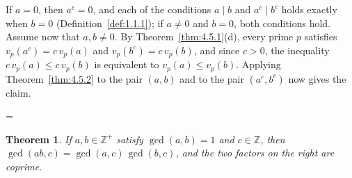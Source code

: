 \documentclass[11pt]{article}
\makeatletter
\theoremstyle{ntstyle}
\newtheorem{theorem}{Theorem}[subsection]
\let\nt@closedisplay\]
\def\nt@guardedclose{\@ifnextchar\par{\nt@closeafterpar}{\@ifnextchar\end{\postdisplaypenalty\@M\nt@closedisplay}{\nt@closedisplay}}}
\def\nt@closeafterpar\par{\@ifnextchar\par{\nt@closeafterpar}{\@ifnextchar\end{\postdisplaypenalty\@M\nt@closedisplay\par}{\nt@closedisplay\par}}}
\renewenvironment{proof}[1][\proofname]{\par
  \pushQED{\qed}\normalfont\topsep\medskipamount\edef\nt@afterproof{\@endparpenalty=\the\@endparpenalty\relax}\@beginparpenalty\@M\@endparpenalty\@M\let\]\nt@guardedclose\trivlist\item[]\textit{#1\@addpunct{.}} \ignorespaces}{\ifvmode\addpenalty\@M\fi\popQED\nt@afterproof\endtrivlist\@endpefalse}
\makeatother
\begin{document}
\begin{proof} If $a=0$, then $a^{c}=0$, and each of the conditions $a\mid b$
	and $a^{c}\mid b^{c}$ holds exactly when $b=0$
	(Definition~\ref{def:1.1.1}); if $a\neq0$ and $b=0$, both conditions hold.
	Assume now that $a,b\neq0$. By Theorem~\ref{thm:4.5.1}(d), every prime $p$
	satisfies $v_p(a^{c})=c\,v_p(a)$ and $v_p(b^{c})=c\,v_p(b)$, and since
	$c>0$, the inequality $c\,v_p(a)\le c\,v_p(b)$ is equivalent to
	$v_p(a)\le v_p(b)$. Applying Theorem~\ref{thm:4.5.2} to the pair $(a,b)$
	and to the pair $(a^{c},b^{c})$ now gives the claim.

\end{proof}
\begin{theorem}\label{thm:4.6.4} If $a,b\in\mathbb{Z}^+$ satisfy $\gcd(a, b) = 1$ and $c\in\mathbb{Z}$, then
	$\gcd(ab, c) = \gcd(a, c)\,\gcd(b, c)$, and the two factors on the
	right are coprime.

\end{theorem}
\end{document}

